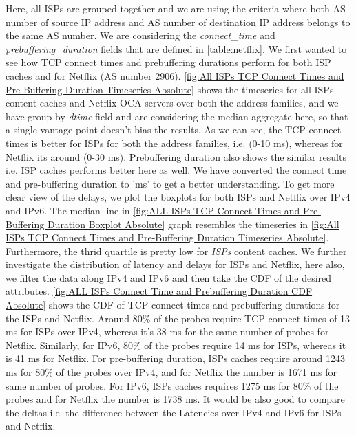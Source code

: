 Here, all ISPs are grouped together and we are using the criteria where both AS number of source IP address and AS number of destination IP address belongs to
the same AS number. We are considering the \textit{connect\_time} and \textit{prebuffering\_duration} fields that are defined in \cref{table:netflix}. We first wanted to see how 
TCP connect times and prebuffering durations perform for both ISP caches and for Netflix (AS number 2906).
\cref{fig:All ISPs TCP Connect Times and Pre-Buffering Duration Timeseries Absolute} shows the timeseries for all ISPs content caches and Netflix OCA servers over both the address families, 
and we have group by \textit{dtime} field and are considering the median aggregate here, so that a single vantage point doesn't bias the results.
As we can see, the TCP connect times is better for ISPs for both the address families, i.e. (0-10 ms), whereas for Netflix its around (0-30 ms). Prebuffering duration also shows the similar
results i.e. ISP caches performs better here as well. We have converted the connect time and pre-buffering duration to 'ms' to get a better understanding.
To get more clear view of the delays, we plot the boxplots for both ISPs and Netflix over IPv4 and IPv6.  The median line in \cref{fig:ALL ISPs TCP Connect Times and Pre-Buffering Duration Boxplot Absolute}
graph resembles the timeseries in \cref{fig:All ISPs TCP Connect Times and Pre-Buffering Duration Timeseries Absolute}. Furthermore, the thrid quartile is pretty low for \textit{ISPs} content caches.
We further investigate the distribution of latency and delays for ISPs and Netflix, here also, we filter the data along IPv4 and IPv6 and then take the CDF of the desired attributes. 
\cref{fig:ALL ISPs Connect Time and Prebuffering Duration CDF Absolute} shows the CDF of TCP connect times and prebuffering durations for the ISPs and Netflix. Around 80\% of the probes require TCP connect times of 13 ms
for ISPs over IPv4, whereas it's 38 ms for the same number of probes for Netflix. Similarly, for IPv6, 80\% of the probes require 14 ms for ISPs, whereas it is 41 ms for Netflix.
For pre-buffering duration, ISPs caches require around 1243 ms for 80\% of the probes over IPv4, and for Netflix the number is 1671 ms for same number of probes. For IPv6, ISPs caches requires
1275 ms for 80\% of the probes and for Netflix the number is 1738 ms. It would be also good to compare the deltas i.e. the difference between the Latencies over IPv4 and IPv6 for ISPs and Netflix.

